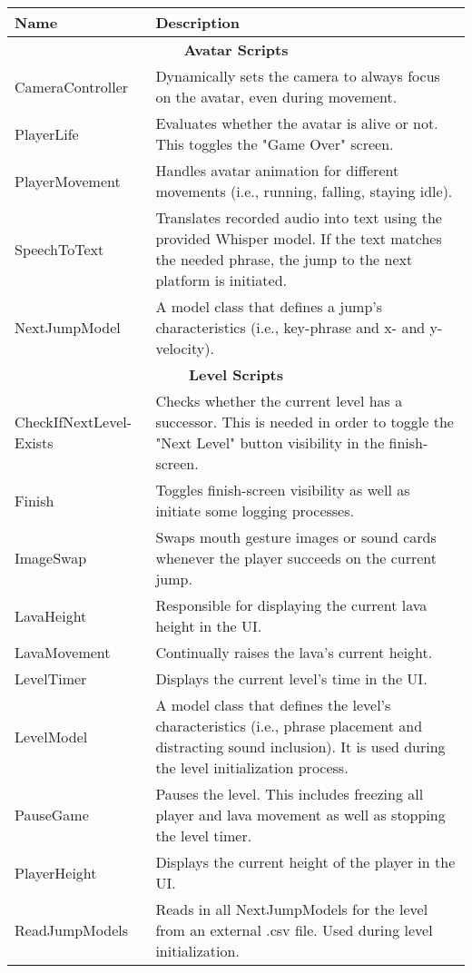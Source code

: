 \documentclass[draft,final]{vutinfth} %
\begin{document}
\begin{longtable}[h]{|p{}|p{}|}
\hline
\textbf{Name} &  \textbf{Description} \\  \hline
\multicolumn{2}{|c|}{\textbf{Avatar Scripts}} \\ \hline
CameraController &  Dynamically sets the camera to always focus on the avatar, even during movement. \\ \hline
PlayerLife & Evaluates whether the avatar is alive or not. This toggles the "Game Over" screen. \\ \hline
PlayerMovement & Handles avatar animation for different movements (i.e., running, falling, staying idle). \\ \hline
SpeechToText & Translates recorded audio into text using the provided Whisper model. If the text matches the needed phrase, the jump to the next platform is initiated. \\ \hline
NextJumpModel & A model class that defines a jump's characteristics (i.e., key-phrase and x- and y-velocity). \\ \hline
\multicolumn{2}{|c|}{\textbf{Level Scripts}} \\ \hline
CheckIfNextLevel- Exists & Checks whether the current level has a successor. This is needed in order to toggle the "Next Level" button visibility in the finish-screen. \\ \hline
Finish & Toggles finish-screen visibility as well as initiate some logging processes. \\ \hline
ImageSwap & Swaps mouth gesture images or sound cards whenever the player succeeds on the current jump. \\ \hline
LavaHeight & Responsible for displaying the current lava height in the UI. \\ \hline
LavaMovement & Continually raises the lava's current height. \\ \hline
LevelTimer & Displays the current level's time in the UI. \\ \hline
LevelModel & A model class that defines the level's characteristics (i.e., phrase placement and distracting sound inclusion). It is used during the level initialization process. \\ \hline
PauseGame & Pauses the level. This includes freezing all player and lava movement as well as stopping the level timer. \\ \hline
PlayerHeight & Displays the current height of the player in the UI. \\ \hline
ReadJumpModels & Reads in all NextJumpModels for the level from an external .csv file. Used during level initialization. \\ \hline

\end{longtable}
\end{document}
